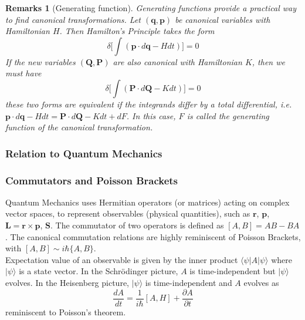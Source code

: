 \documentclass[a4paper]{article}
\newtheorem{remarks}{Remarks}[section]
\theoremstyle{new}
\begin{document}
\begin{remarks}[Generating function]
Generating functions provide a practical way to find canonical transformations. Let $(\mathbf{q},\mathbf{p})$ be canonical variables with Hamiltonian $H$. Then Hamilton's Principle takes the form
$$\delta\bigg[\int(\mathbf{p}\cdot d\mathbf{q}-Hdt)\bigg]=0$$
If the new variables $(\mathbf{Q},\mathbf{P})$ are also canonical with Hamiltonian $K$, then we must have
$$\delta\bigg[\int(\mathbf{P}\cdot d\mathbf{Q}-Kdt)\bigg]=0$$
these two forms are equivalent if the integrands differ by a total differential, i.e. $\mathbf{p}\cdot d\mathbf{q}-Hdt=\mathbf{P}\cdot d\mathbf{Q}-Kdt+dF$. In this case, $F$ is called the generating function of the canonical transformation. 
\end{remarks}
\newpage
\subsubsection{Relation to Quantum Mechanics}
\subsubsection*{Commutators and Poisson Brackets}
Quantum Mechanics uses Hermitian operators (or matrices) acting on complex vector spaces, to represent observables (physical quantities), such as $\mathbf{r}$, $\mathbf{p}$, $\mathbf{L}=\mathbf{r}\times\mathbf{p}$, $\mathbf{S}$. The commutator of two operators is defined as $[A,B]=AB-BA$. The canonical commutation relations are highly reminiscent of Poisson Brackets, with $[A,B]\sim i\hbar\{A,B\}$.\\[5pt] 
Expectation value of an observable is given by the inner product $\langle\psi|A|\psi\rangle$ where $|\psi\rangle$ is a state vector. In the Schr\"{o}dinger picture, $A$ is time-independent but $|\psi\rangle$ evolves. In the Heisenberg picture, $|\psi\rangle$ is time-independent and $A$ evolves as
$$\frac{dA}{dt}=\frac{1}{i\hbar}[A,H]+\frac{\partial A}{\partial t}$$
reminiscent to Poisson's theorem.
\end{document}
